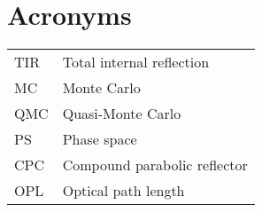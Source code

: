 
\chapter*{Acronyms}
\begin{tabular}{l l}
TIR &{Total internal reflection}\\
MC &{Monte Carlo}\\
QMC &{Quasi-Monte Carlo}\\
PS &{Phase space}\\
CPC &{Compound parabolic reflector}\\
OPL &{Optical path length}
\end{tabular}

